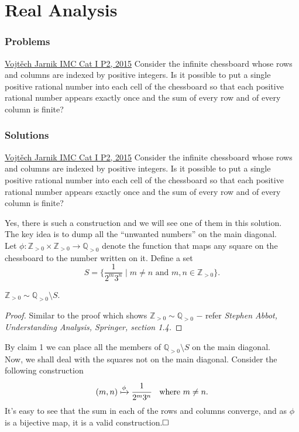 \chapter{Real Analysis}
\subsection{Problems}
\begin{problem}{1}{\href{https://artofproblemsolving.com/community/q1h1127671p33458391}{Vojt\v{e}ch Jarnik IMC Cat I P2, 2015}}
	Consider the infinite chessboard whose rows and columns are indexed by positive integers. Is it possible to put a single positive rational number into each cell of the chessboard so that each positive rational number appears exactly once and the sum of every row and of every column is finite?
\end{problem}



\newpage
\subsection{Solutions}
\begin{problem}{1}{\href{https://artofproblemsolving.com/community/q1h1127671p33458391}{Vojt\v{e}ch Jarnik IMC Cat I P2, 2015}} Consider the infinite chessboard whose rows and columns are indexed by positive integers. Is it possible to put a single positive rational number into each cell of the chessboard so that each positive rational number appears exactly once and the sum of every row and of every column is finite?
	\begin{solution} Yes, there is such a construction and we will see one of them in this solution.\\
		\indent The key idea is to dump all the ``unwanted numbers'' on the main diagonal.\\
	Let $\phi:\mathbb{Z}_{>0}\times\mathbb{Z}_{>0}\to \mathbb{Q}_{>0}$ denote the function that maps any square on the chessboard to the number written on it. Define a set 
		$$S=\Big\{\frac{1}{2^m3^n}\mid m\ne n \text{ and } m,n\in\mathbb{Z}_{>0}\Big\}.$$

	\begin{numclaim}{1}
		$\mathbb{Z}_{>0}\sim \mathbb{Q}_{>0}\setminus S$.
	\end{numclaim}
	\begin{proof} Similar to the proof which shows $\mathbb{Z}_{>0}\sim \mathbb{Q}_{>0}$ $-$ refer \emph{Stephen Abbot, Understanding Analysis, Springer, section 1.4.}
	\end{proof}
	\noindent By claim 1 we can place all the members of $\mathbb{Q}_{>0}\setminus S$ on the main diagonal.\\
	Now, we shall deal with the squares not on the main diagonal. Consider the following construction
$$(m, n )\xmapsto{\phi} \cfrac{1}{2^m3^n}\quad \text{where $m\ne n$}.$$
	\noindent It's easy to see that the sum in each of the rows and columns converge, and as $\phi$ is a bijective map, it is a valid construction.$\qedwhite$
	\end{solution}
\end{problem}
